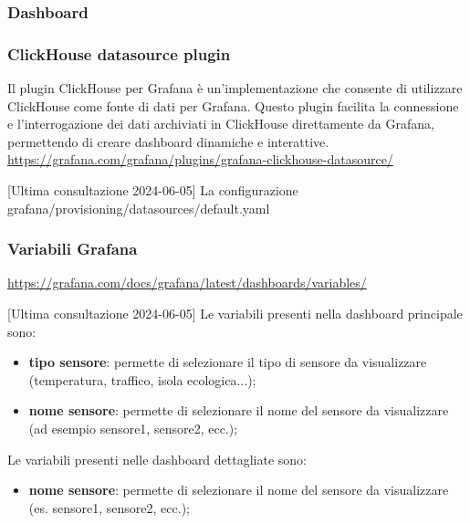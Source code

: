 \subsubsection{Dashboard}

\subsubsection{ClickHouse datasource plugin}
Il plugin ClickHouse per Grafana è un'implementazione che consente di utilizzare ClickHouse come fonte di dati per Grafana. Questo plugin facilita la connessione e l'interrogazione dei dati archiviati in ClickHouse direttamente da Grafana, permettendo di creare dashboard dinamiche e interattive.
\url{https://grafana.com/grafana/plugins/grafana-clickhouse-datasource/}

[Ultima consultazione 2024-06-05]
La configurazione  grafana/provisioning/datasources/default.yaml


\subsubsection{Variabili Grafana}
\url{https://grafana.com/docs/grafana/latest/dashboards/variables/}

[Ultima consultazione 2024-06-05]
Le variabili presenti nella dashboard principale sono:
\begin{itemize}
	\item \textbf{tipo sensore}: permette di selezionare il tipo di sensore da visualizzare (temperatura, traffico, isola ecologica...);
	\item \textbf{nome sensore}: permette di selezionare il nome del sensore da visualizzare (ad esempio sensore1, sensore2, ecc.); %
\end{itemize}
Le variabili presenti nelle dashboard dettagliate sono:
\begin{itemize}
	\item \textbf{nome sensore}: permette di selezionare il nome del sensore da visualizzare (es. sensore1, sensore2, ecc.);
\end{itemize}

